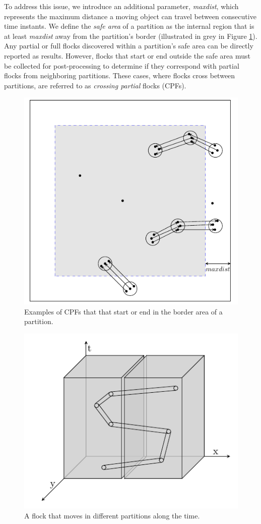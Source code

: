 To address this issue, we introduce an additional parameter, \textit{maxdist}, which represents the maximum distance a moving object can travel between consecutive time instants. We define the \textit{safe area} of a partition as the internal region that is at least \textit{maxdist} away from the partition’s border (illustrated in grey in Figure \ref{fig:maxdist}). Any partial or full flocks discovered within a partition’s safe area can be directly reported as results. However, flocks that start or end outside the safe area must be collected for post-processing to determine if they correspond with partial flocks from neighboring partitions. These cases, where flocks cross between partitions, are referred to as \textit{crossing partial} flocks (CPFs).

\begin{figure}
    \centering
    \includegraphics[width=0.7\linewidth]{figures/maxdist.pdf}
    \caption{Examples of CPFs that that start or end in the border area of a partition.}\label{fig:maxdist}
\end{figure}

\begin{figure}
    \centering
    \includegraphics[width=0.8\linewidth]{figures/cubo2.pdf}
    \caption{A flock that moves in different partitions along the time.}\label{fig:simple_alternative}
\end{figure}


